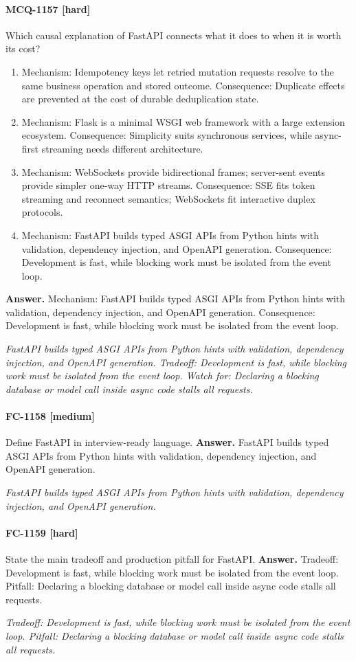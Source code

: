 \paragraph{MCQ-1157 [hard]} Which causal explanation of FastAPI connects what it does to when it is worth its cost?
\begin{enumerate}[label=\Alph*.]
\item Mechanism: Idempotency keys let retried mutation requests resolve to the same business operation and stored outcome. Consequence: Duplicate effects are prevented at the cost of durable deduplication state.
\item Mechanism: Flask is a minimal WSGI web framework with a large extension ecosystem. Consequence: Simplicity suits synchronous services, while async-first streaming needs different architecture.
\item Mechanism: WebSockets provide bidirectional frames; server-sent events provide simpler one-way HTTP streams. Consequence: SSE fits token streaming and reconnect semantics; WebSockets fit interactive duplex protocols.
\item Mechanism: FastAPI builds typed ASGI APIs from Python hints with validation, dependency injection, and OpenAPI generation. Consequence: Development is fast, while blocking work must be isolated from the event loop.
\end{enumerate}
\noindent\textbf{Answer.} Mechanism: FastAPI builds typed ASGI APIs from Python hints with validation, dependency injection, and OpenAPI generation. Consequence: Development is fast, while blocking work must be isolated from the event loop.
\par\textit{FastAPI builds typed ASGI APIs from Python hints with validation, dependency injection, and OpenAPI generation. Tradeoff: Development is fast, while blocking work must be isolated from the event loop. Watch for: Declaring a blocking database or model call inside async code stalls all requests.}
\paragraph{FC-1158 [medium]} Define FastAPI in interview-ready language.
\noindent\textbf{Answer.} FastAPI builds typed ASGI APIs from Python hints with validation, dependency injection, and OpenAPI generation.
\par\textit{FastAPI builds typed ASGI APIs from Python hints with validation, dependency injection, and OpenAPI generation.}
\paragraph{FC-1159 [hard]} State the main tradeoff and production pitfall for FastAPI.
\noindent\textbf{Answer.} Tradeoff: Development is fast, while blocking work must be isolated from the event loop. Pitfall: Declaring a blocking database or model call inside async code stalls all requests.
\par\textit{Tradeoff: Development is fast, while blocking work must be isolated from the event loop. Pitfall: Declaring a blocking database or model call inside async code stalls all requests.}

